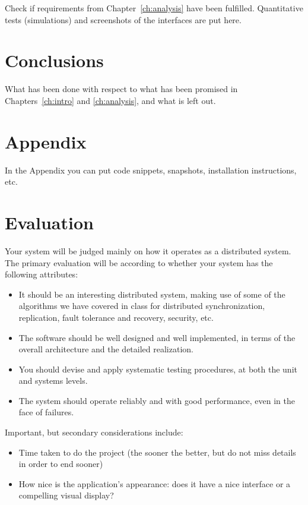 \documentclass[a4paper, oneside]{memoir}
\begin{document}
Check if requirements from Chapter~\ref{ch:analysis} have been fulfilled.
Quantitative tests (simulations) and screenshots of the interfaces are put here.


\chapter{Conclusions}

What has been done with respect to what has been promised in Chapters~\ref{ch:intro} and \ref{ch:analysis}, and what is left out.

\appendix

\chapter{Appendix}

In the Appendix you can put code snippets, snapshots, installation instructions, etc.


\chapter*{Evaluation}
Your system will be judged mainly on how it operates as a distributed system. The primary evaluation will be according to whether your system has the following attributes:
\begin{itemize}
\item  It should be an interesting distributed system, making use of some of the algorithms we have covered in class for distributed synchronization, replication, fault tolerance and recovery, security, etc.
\item The software should be well designed and well implemented, in terms of the overall architecture and the detailed realization.
\item You should devise and apply systematic testing procedures, at both the unit and systems levels.
\item The system should operate reliably and with good performance, even in the face of failures.
\end{itemize}
Important, but secondary considerations include:
\begin{itemize}
\item Time taken to do the project (the sooner the better, but do not miss details in order to end sooner)
\item  How nice is the application's appearance: does it have a nice interface or a compelling visual display?
\end{itemize}
\end{document}
